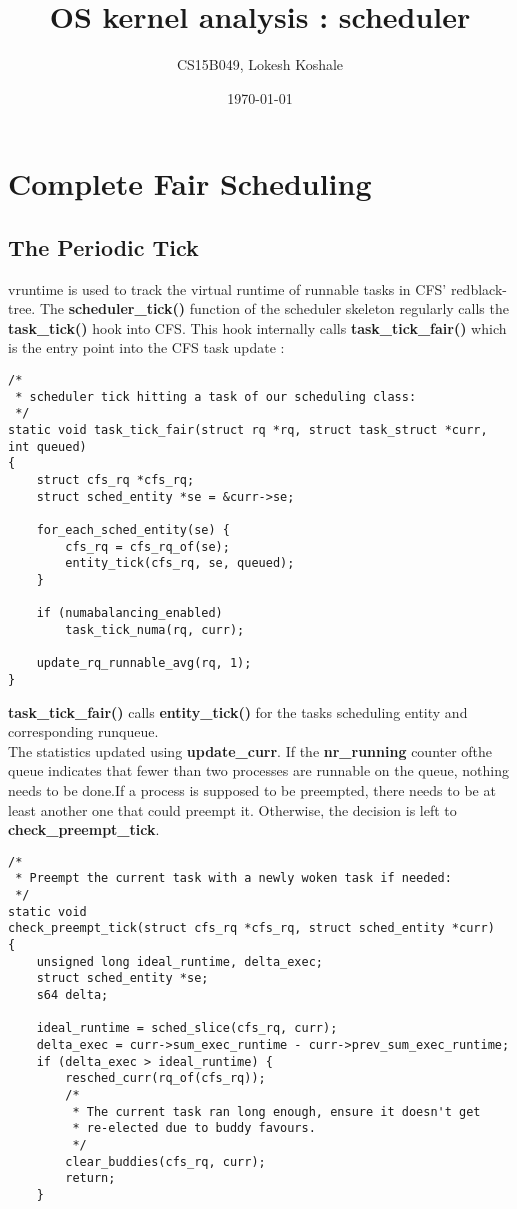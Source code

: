 \documentclass[a4paper]{article}
\title{OS kernel analysis : scheduler }
\author{CS15B049, Lokesh Koshale}
\date{\today}
\begin{document}
\maketitle

\section{Complete Fair Scheduling}

\subsection{The Periodic Tick }
vruntime is used to track the virtual runtime of runnable tasks in CFS' redblack-tree. The \textbf{scheduler\_tick()} function of the scheduler skeleton regularly calls the \textbf{task\_tick()} hook into CFS. This hook internally calls \textbf{task\_tick\_fair()} which is the entry point into the CFS task update :
\begin{verbatim}
/*
 * scheduler tick hitting a task of our scheduling class:
 */
static void task_tick_fair(struct rq *rq, struct task_struct *curr, int queued)
{
	struct cfs_rq *cfs_rq;
	struct sched_entity *se = &curr->se;

	for_each_sched_entity(se) {
		cfs_rq = cfs_rq_of(se);
		entity_tick(cfs_rq, se, queued);
	}

	if (numabalancing_enabled)
		task_tick_numa(rq, curr);

	update_rq_runnable_avg(rq, 1);
}
\end{verbatim}
\textbf{task\_tick\_fair()} calls \textbf{entity\_tick()} for the tasks scheduling entity and corresponding runqueue.\\
The statistics updated using \textbf{update\_curr}. If the \textbf{nr\_running} counter ofthe queue indicates that fewer than two processes are runnable on the queue, nothing needs to be done.If a process is supposed to be preempted, there needs to be at least another one that could preempt it. Otherwise, the decision is left to \textbf{check\_preempt\_tick}.
\begin{verbatim}
/*
 * Preempt the current task with a newly woken task if needed:
 */
static void
check_preempt_tick(struct cfs_rq *cfs_rq, struct sched_entity *curr)
{
	unsigned long ideal_runtime, delta_exec;
	struct sched_entity *se;
	s64 delta;

	ideal_runtime = sched_slice(cfs_rq, curr);
	delta_exec = curr->sum_exec_runtime - curr->prev_sum_exec_runtime;
	if (delta_exec > ideal_runtime) {
		resched_curr(rq_of(cfs_rq));
		/*
		 * The current task ran long enough, ensure it doesn't get
		 * re-elected due to buddy favours.
		 */
		clear_buddies(cfs_rq, curr);
		return;
	}
\end{verbatim}
\end{document}
